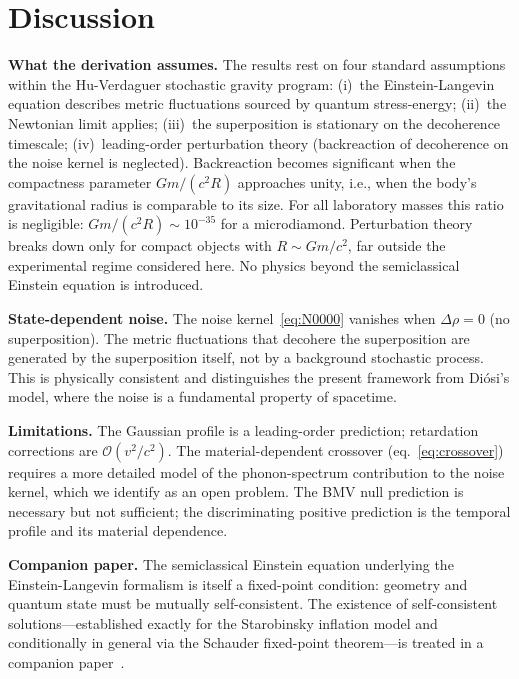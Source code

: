 \documentclass[12pt,a4paper]{article}
\begin{document}
\section{Discussion}
\label{sec:discussion}

\textbf{What the derivation assumes.} The results rest on four standard assumptions within
the Hu-Verdaguer stochastic gravity program: (i)~the Einstein-Langevin equation describes
metric fluctuations sourced by quantum stress-energy; (ii)~the Newtonian limit applies;
(iii)~the superposition is stationary on the decoherence timescale; (iv)~leading-order
perturbation theory (backreaction of decoherence on the noise kernel is neglected).
Backreaction becomes significant when the compactness parameter $Gm/(c^2 R)$ approaches
unity, i.e., when the body's gravitational radius is comparable to its size. For all
laboratory masses this ratio is negligible: $Gm/(c^2 R) \sim 10^{-35}$ for a
microdiamond. Perturbation theory breaks down only for compact objects with
$R \sim Gm/c^2$, far outside the experimental regime considered here.
No physics beyond the semiclassical Einstein equation is introduced.

\textbf{State-dependent noise.} The noise kernel~\eqref{eq:N0000} vanishes when
$\Delta\rho = 0$ (no superposition). The metric fluctuations that decohere the
superposition are generated by the superposition itself, not by a background stochastic
process. This is physically consistent and distinguishes the present framework
from Di\'osi's model, where the noise is a fundamental property of spacetime.

\textbf{Limitations.} The Gaussian profile is a leading-order prediction; retardation
corrections are $\mathcal{O}(v^2/c^2)$. The material-dependent crossover
(eq.~\ref{eq:crossover}) requires a more detailed model of the phonon-spectrum contribution
to the noise kernel, which we identify as an open problem. The BMV null prediction is
necessary but not sufficient; the discriminating positive prediction is the temporal
profile and its material dependence.

\textbf{Companion paper.} The semiclassical Einstein equation underlying the
Einstein-Langevin formalism is itself a fixed-point condition: geometry and quantum state
must be mutually self-consistent. The existence of self-consistent solutions---established
exactly for the Starobinsky inflation model and conditionally in general via the Schauder
fixed-point theorem---is treated in a companion paper~\cite{fixed_point}.
\end{document}

